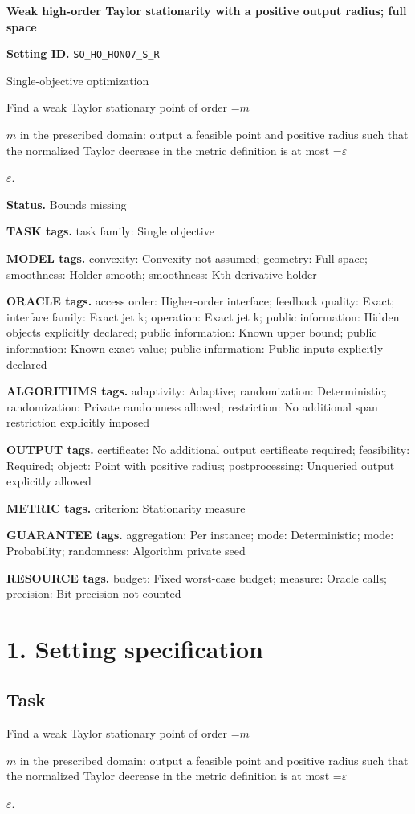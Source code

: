 \documentclass[10pt,a4paper]{article}
\newcommand{\AtlasMath}[1]{\par\begingroup\centering\setbox0=\hbox{$\displaystyle #1$}\ifdim\wd0>1.4\linewidth\typeout{ATLAS WIDE FORMULA: \the\wd0}\fi\ifdim\wd0>\linewidth\resizebox{\linewidth}{!}{\box0}\else\box0\fi\par\endgroup}
\newcommand{\AtlasInlineMath}[1]{\begingroup\setbox0=\hbox{$#1$}\ifdim\wd0>.4\linewidth\endgroup\AtlasMath{#1}\else\endgroup$#1$\fi}
\begin{document}
\raggedright

{\LARGE\bfseries\sffamily\color{AtlasNavy} Weak high-order Taylor stationarity with a positive output radius; full space\par}\vspace{5pt}
\textbf{Setting ID.} \texttt{SO\_\allowbreak{}HO\_\allowbreak{}HON07\_\allowbreak{}S\_\allowbreak{}R}

Single-objective optimization

Find a weak Taylor stationary point of order \AtlasInlineMath{m} in the prescribed domain: output a feasible point and positive radius such that the normalized Taylor decrease in the metric definition is at most \AtlasInlineMath{\varepsilon}.

\textbf{Status.} Bounds missing

\textbf{TASK tags.} task family: Single objective

\textbf{MODEL tags.} convexity: Convexity not assumed; geometry: Full space; smoothness: Holder smooth; smoothness: Kth derivative holder

\textbf{ORACLE tags.} access order: Higher-order interface; feedback quality: Exact; interface family: Exact jet k; operation: Exact jet k; public information: Hidden objects explicitly declared; public information: Known upper bound; public information: Known exact value; public information: Public inputs explicitly declared

\textbf{ALGORITHMS tags.} adaptivity: Adaptive; randomization: Deterministic; randomization: Private randomness allowed; restriction: No additional span restriction explicitly imposed

\textbf{OUTPUT tags.} certificate: No additional output certificate required; feasibility: Required; object: Point with positive radius; postprocessing: Unqueried output explicitly allowed

\textbf{METRIC tags.} criterion: Stationarity measure

\textbf{GUARANTEE tags.} aggregation: Per instance; mode: Deterministic; mode: Probability; randomness: Algorithm private seed

\textbf{RESOURCE tags.} budget: Fixed worst-case budget; measure: Oracle calls; precision: Bit precision not counted

\section{1. Setting specification}
\subsection{Task}
Find a weak Taylor stationary point of order \AtlasInlineMath{m} in the prescribed domain: output a feasible point and positive radius such that the normalized Taylor decrease in the metric definition is at most \AtlasInlineMath{\varepsilon}.
\end{document}
